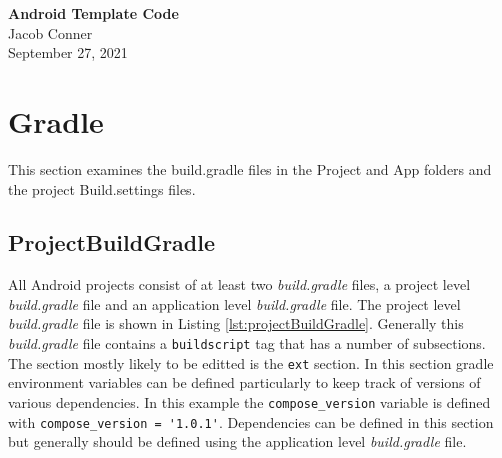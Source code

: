 \documentclass[12pt]{article}
\begin{document}
\begin{centering}
{\large\textbf{Android Template Code}}\\ %
Jacob Conner\\                     %
September 27, 2021\\                      %
\end{centering}

\tableofcontents

\section{Gradle}
This section examines the build.gradle files in the Project and App folders and the project Build.settings files. 
\newpage
\subsection{ProjectBuildGradle}

All Android projects consist of at least two \textit{build.gradle} files, a project level \textit{build.gradle} file and an application level \textit{build.gradle} file. The project level \textit{build.gradle} file is shown in Listing  \ref{lst:projectBuildGradle}. Generally this 
\textit{build.gradle} file contains a \verb|buildscript| tag that has a number of subsections. The section mostly likely to be 
editted is the \verb|ext| section. In this section gradle environment variables can be defined particularly to keep track 
of versions of various dependencies. In this example the \verb|compose_version| variable is defined with \verb|compose_version = '1.0.1'|. Dependencies can be defined in this section but generally should be defined using the application level \textit{build.gradle} file. 

\newpage
\end{document}
